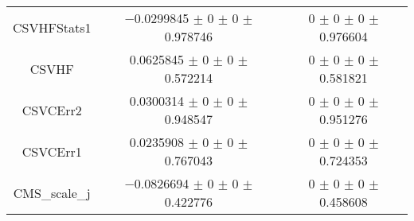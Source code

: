 \begin{table}
\begin{tabular}{ccc}
CSVHFStats1 & \num{-0.0299845} $\pm$ \num{0} $\pm$ \num{0} $\pm$ \num{0.978746} & \num{0} $\pm$ \num{0} $\pm$ \num{0} $\pm$ \num{0.976604}\\
CSVHF & \num{0.0625845} $\pm$ \num{0} $\pm$ \num{0} $\pm$ \num{0.572214} & \num{0} $\pm$ \num{0} $\pm$ \num{0} $\pm$ \num{0.581821}\\
CSVCErr2 & \num{0.0300314} $\pm$ \num{0} $\pm$ \num{0} $\pm$ \num{0.948547} & \num{0} $\pm$ \num{0} $\pm$ \num{0} $\pm$ \num{0.951276}\\
CSVCErr1 & \num{0.0235908} $\pm$ \num{0} $\pm$ \num{0} $\pm$ \num{0.767043} & \num{0} $\pm$ \num{0} $\pm$ \num{0} $\pm$ \num{0.724353}\\
CMS\_scale\_j & \num{-0.0826694} $\pm$ \num{0} $\pm$ \num{0} $\pm$ \num{0.422776} & \num{0} $\pm$ \num{0} $\pm$ \num{0} $\pm$ \num{0.458608}\\
\bottomrule
\end{tabular}
\end{table}